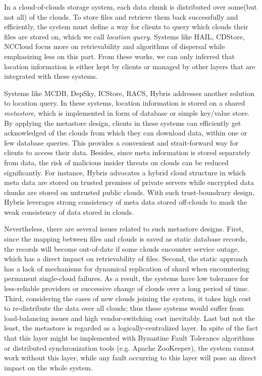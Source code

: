 In a cloud-of-clouds storage system, each data chunk is distributed over some(but not all) of the clouds. To store files and retrieve them back successfully and efficiently, the system must define a way for clients to query which clouds their files are stored on, which we call \textit{location query}. Systems like HAIL\cite{bowers2009hail}, CDStore\cite{li2015cdstore}, NCCloud\cite{hu2012nccloud} focus more on retrievability and algorithms of dispersal while emphasizing less on this part. From these works, we can only inferred that location information is either kept by clients or managed by other layers that are integrated with these systems.

Systems like MCDB\cite{alzain2011mcdb}, DepSky\cite{bessani2013depsky}, ICStore\cite{cachin2010dependable}, RACS\cite{abu2010racs}, Hybris\cite{dobre2014hybris} addresses another solution to location query. In these systems, location information is stored on a shared \textit{metastore}, which is implemented in form of database or simple key/value store. By applying the metastore design, clients in these systems can efficiently get acknowledged of the clouds from which they can download data, within one or few database queries. This provides a convenient and strait-forward way for clients to access their data. Besides, since meta information is stored separately from data, the risk of malicious insider threats on clouds can be reduced significantly. For instance, Hybris\cite{dobre2014hybris} advocates a hybrid cloud structure in which meta data are stored on trusted premises of private servers while encrypted data chunks are stored on untrusted public clouds. With such trust-boundrary design, Hybris leverages strong consistency of meta data stored off-clouds to mask the weak consistency of data stored in clouds.

Nevertheless, there are several issues related to such metastore designs. First, since the mapping between files and clouds is saved as static database records, the records will become out-of-date if some clouds encounter service outage, which has a direct impact on retrievability of files. Second, the static approach has a lack of mechanisms for dynamical replication of shard when encountering permanent single-cloud failures. As a result, the systems have low tolerance for less-reliable providers or successive change of clouds over a long period of time. Third, considering the cases of new clouds joining the system, it takes high cost to re-distribute the data over all clouds; thus these systems would suffer from load-balancing issues and high vendor-switching cost inevitably. Last but not the least, the metastore is regarded as a logically-centralized layer. In spite of the fact that this layer might be implemented with Byzantine Fault Tolerance algorithms or distributed synchronization tools (e.g. Apache ZooKeeper\cite{zookeeper}), the system cannot work without this layer, while any fault occurring to this layer will pose an direct impact on the whole system.

